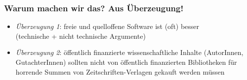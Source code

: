 \documentclass{beamer}
\begin{document}

\begin{frame}[label=ct2]
  \frametitle{Warum machen wir das? Aus Überzeugung!}

  \onslide<+->

  \begin{itemize}
  \item \emph{Überzeugung 1}: freie und quelloffene Software ist (oft) besser\\
    (technische + nicht technische Argumente)\\
    \bigskip\onslide<+->
  \item \emph{Überzeugung 2}: öffentlich finanzierte wissenschaftliche Inhalte
    (AutorInnen, GutachterInnen) sollten nicht von öffentlich finanzierten
    Bibliotheken für horrende Summen von Zeitschriften-Verlagen gekauft werden
    müssen
  \end{itemize}
\end{frame}

\end{document}
